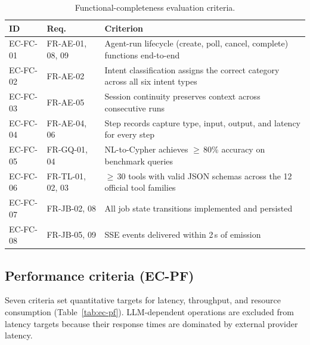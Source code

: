 \documentclass[a4paper,noexaminfo]{sapthesis}
\begin{document}
\begin{table}[ht]
\centering
\caption{Functional-completeness evaluation criteria.}
\label{tab:ec-fc}
\small
\begin{tabularx}{\textwidth}{@{}l l X@{}}
    \hline
    \textbf{ID} & \textbf{Req.} & \textbf{Criterion} \\
    \hline
    EC-FC-01 & FR-AE-01, 08, 09 & Agent-run lifecycle (create, poll,
        cancel, complete) functions end-to-end \\
    EC-FC-02 & FR-AE-02 & Intent classification assigns the correct
        category across all six intent types \\
    EC-FC-03 & FR-AE-05 & Session continuity preserves context across
        consecutive runs \\
    EC-FC-04 & FR-AE-04, 06 & Step records capture type, input, output,
        and latency for every step \\
    EC-FC-05 & FR-GQ-01, 04 & NL-to-Cypher achieves $\geq$\,80\%
        accuracy on benchmark queries \\
    EC-FC-06 & FR-TL-01, 02, 03 & $\geq$\,30 tools with valid JSON
        schemas across the 12 official tool families \\
    EC-FC-07 & FR-JB-02, 08 & All job state transitions implemented
        and persisted \\
    EC-FC-08 & FR-JB-05, 09 & SSE events delivered within 2\,s of
        emission \\
    \hline
\end{tabularx}
\end{table}

\subsection{Performance criteria (EC-PF)}

Seven criteria set quantitative targets for latency, throughput, and
resource consumption (Table~\ref{tab:ec-pf}).  LLM-dependent operations
are excluded from latency targets because their response times are
dominated by external provider latency.
\end{document}
